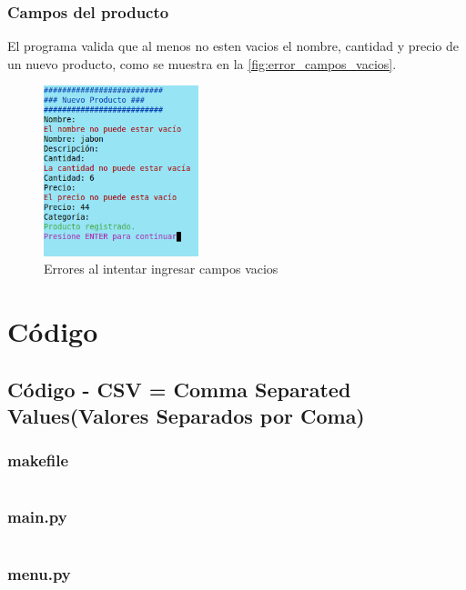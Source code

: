 \documentclass[12pt]{article}
\begin{document}
\subsubsection{Campos del producto}

El programa valida que al menos no esten vacios el nombre, cantidad y precio de un nuevo producto, como se muestra en la \autoref{fig:error_campos_vacios}.

\begin{figure}[H]
	\centering
	\setlength{\fboxrule}{0pt}
	\includegraphics[width=0.4\textwidth]{Imagenes/error_campos_vacios.png}
	\caption{Errores al intentar ingresar campos vacios}
	\label{fig:error_campos_vacios}
\end{figure}


\section{Código}
\subsection{Código - CSV = Comma Separated Values(Valores Separados por Coma)}

\subsubsection{makefile}
\inputminted[fontsize=\small]{make}{CodigoCSV/makefile}

\subsubsection{main.py}
\inputminted[fontsize=\small, breaklines=true]{python}{CodigoCSV/main.py}

\subsubsection{menu.py}
\inputminted[fontsize=\small, breaklines=true]{python}{CodigoCSV/menu.py}
\end{document}
